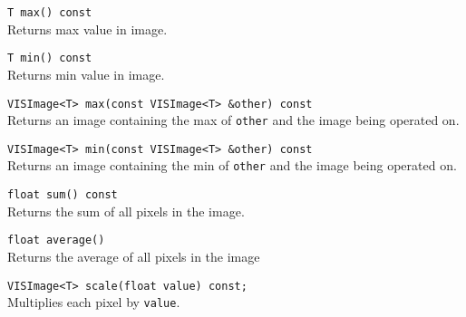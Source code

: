 \begin{description}
{\tt T max() const}\\
Returns max value in image.
\item[{\tt min()} --]
{\tt T min() const}\\
Returns min value in image.
\item[{\tt max(image)} --]
{\tt VISImage<T> max(const VISImage<T> \&other) const}\\
Returns an image containing the max of {\tt other} and the image
being operated on.
\item[{\tt min(image)} --]
{\tt VISImage<T> min(const VISImage<T> \&other) const}\\
Returns an image containing the min of {\tt other} and the image
being operated on.
\item[{\tt sum()} --]
{\tt float sum() const}\\
Returns the sum of all pixels in the image.
\item[{\tt average()} --]
{\tt float average()}\\
Returns the average of all pixels in the image
\item[{\tt scale(value)} --]
{\tt VISImage<T> scale(float value) const;}\\
Multiplies each pixel by {\tt value}.
\end{description}

